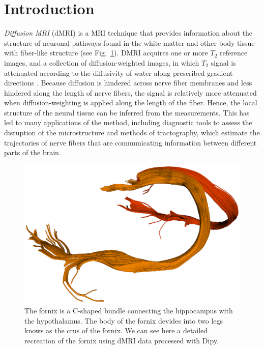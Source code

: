 \documentclass{bioinfo}
\begin{document}
\section{Introduction}

\emph{Diffusion MRI} (dMRI) \citep{merboldt-hanicke-etal:85,
  lebihan-breton:85, taylor-bushell:85}
is a MRI technique \citep{callaghan:91} that provides information
about the structure of neuronal pathways found in the white matter and
other body tissue with fiber-like structure (see Fig.~\ref{Fig:fornix}). DMRI acquires one or more
$T_{2}$ reference images, and a collection of diffusion-weighted images, in which $T_{2}$ signal is attenuated according
to the diffusivity of water along prescribed gradient directions
\citep{behrens-johansen-berg:09, jones:10}. Because diffusion is hindered
across nerve fiber membranes and less hindered along the length of nerve fibers, the
signal is relatively more attenuated when diffusion-weighting is applied along
the length of the fiber. Hence, the local structure of the neural tissue can be
inferred from the measurements. This has led to many applications of the method,
including diagnostic tools to assess the disruption of the microstructure and
methods of tractography, which estimate the trajectories of nerve fibers that
are communicating information between different parts of the brain.

\begin{figure}
\includegraphics[scale=0.55]{Figures/fornix.eps}
\centering{}
\caption{The fornix is a C-shaped bundle connecting the hippocampus with the hypothalamus. The body of the fornix devides into two legs knows as the crus of the fornix. We can see here a detailed recreation of the fornix using dMRI data processed with Dipy. \label{Fig:fornix}}
\end{figure}
\end{document}
